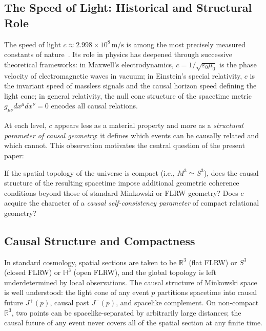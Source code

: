\documentclass[12pt,a4paper]{article}
\theoremstyle{plain}
\theoremstyle{definition}
\theoremstyle{remark}
\begin{document}
\subsection{The Speed of Light: Historical and Structural Role}

The speed of light $c \approx 2.998 \times 10^8\,\text{m/s}$ is among the most
precisely measured constants of nature~\cite{CODATA18}.
Its role in physics has deepened through successive theoretical frameworks:
in Maxwell's electrodynamics, $c = 1/\sqrt{\varepsilon_0\mu_0}$ is the
phase velocity of electromagnetic waves in vacuum;
in Einstein's special relativity, $c$ is the invariant speed of massless signals
and the causal horizon speed defining the light cone;
in general relativity, the null cone structure of the spacetime metric
$g_{\mu\nu}dx^\mu dx^\nu = 0$ encodes all causal relations.

At each level, $c$ appears less as a material property and more as a
\emph{structural parameter of causal geometry}:
it defines which events can be causally related and which cannot.
This observation motivates the central question of the present paper:

\begin{tcolorbox}[alertbox={Central Question}]
If the spatial topology of the universe is compact (i.e., $M^3 \simeq S^3$),
does the causal structure of the resulting spacetime impose additional geometric
coherence conditions beyond those of standard Minkowski or FLRW geometry?
Does $c$ acquire the character of a \emph{causal self-consistency parameter}
of compact relational geometry?
\end{tcolorbox}

\subsection{Causal Structure and Compactness}

In standard cosmology, spatial sections are taken to be $\mathbb{R}^3$ (flat FLRW)
or $S^3$ (closed FLRW) or $\mathbb{H}^3$ (open FLRW),
and the global topology is left underdetermined by local observations.
The causal structure of Minkowski space is well understood:
the light cone of any event $p$ partitions spacetime into causal future
$J^+(p)$, causal past $J^-(p)$, and spacelike complement.
On non-compact $\mathbb{R}^3$, two points can be spacelike-separated by
arbitrarily large distances; the causal future of any event never covers
all of the spatial section at any finite time.
\end{document}
